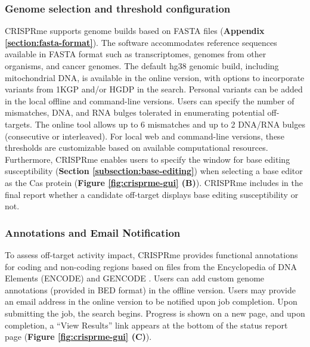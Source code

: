 \documentclass[a4paper, titlepage, openright]{book}
\newcommand{\crisprme}{CRISPRme\xspace}
\begin{document}
\subsubsection{Genome selection and threshold configuration}
\crisprme supports genome builds based on FASTA files (\textbf{Appendix \ref{section:fasta-format}}). The software accommodates reference sequences available in FASTA format such as transcriptomes, genomes from other organisms, and cancer genomes. The default hg38 genomic build, including mitochondrial DNA, is available in the online version, with options to incorporate variants from 1KGP and/or HGDP in the search. Personal variants can be added in the local offline and command-line versions. Users can specify the number of mismatches, DNA, and RNA bulges tolerated in enumerating potential off-targets. The online tool allows up to 6 mismatches and up to 2 DNA/RNA bulges (consecutive or interleaved). For local web and command-line versions, these thresholds are customizable based on available computational resources. Furthermore, \crisprme enables users to specify the window for base editing susceptibility (\textbf{Section \ref{subsection:base-editing}}) when selecting a base editor as the Cas protein (\textbf{Figure \ref{fig:crisprme-gui} (B)}). \crisprme includes in the final report whether a candidate off-target displays base editing susceptibility or not. 

\subsubsection{Annotations and Email Notification}
To assess off-target activity impact, \crisprme provides functional annotations for coding and non-coding regions based on files from the Encyclopedia of DNA Elements (ENCODE) \citep{encode2012integrated} and GENCODE \citep{frankish2019gencode}. Users can add custom genome annotations (provided in BED format) in the offline version. Users may provide an email address in the online version to be notified upon job completion. Upon submitting the job, the search begins. Progress is shown on a new page, and upon completion, a “View Results” link appears at the bottom of the status report page (\textbf{Figure \ref{fig:crisprme-gui} (C)}).

\end{document}

